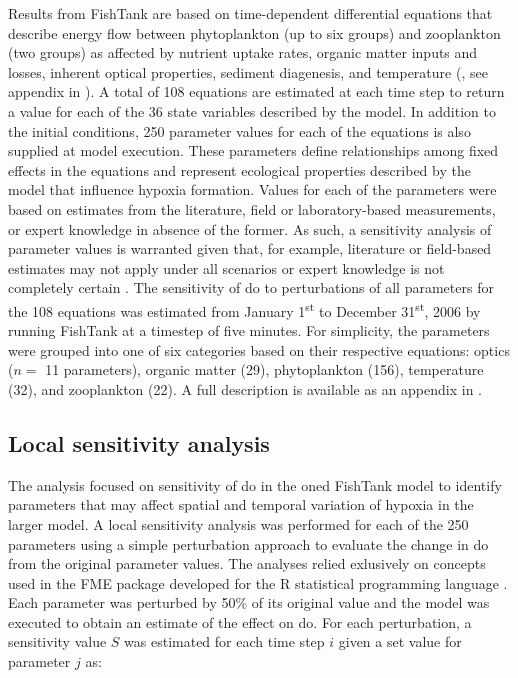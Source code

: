 \documentclass[letterpaper,12pt,oneside]{article}\usepackage[]{graphicx}\usepackage[]{color}
\begin{document}
Results from FishTank are based on time-dependent differential equations that describe energy flow between phytoplankton (up to six groups) and zooplankton (two groups) as affected by nutrient uptake rates, organic matter inputs and losses, inherent optical properties, sediment diagenesis, and temperature (\citealt{Penta08,Eldridge10}, see appendix in ).  A total of 108 equations are estimated at each time step to return a value for each of the 36 state variables described by the model.  In addition to the initial conditions, 250 parameter values for each of the equations is also supplied at model execution.  These parameters define relationships among fixed effects in the equations and represent ecological properties described by the model that influence hypoxia formation.  Values for each of the parameters were based on estimates from the literature, field or laboratory-based measurements, or expert knowledge in absence of the former.  As such, a sensitivity analysis of parameter values is warranted given that, for example, literature or field-based estimates may not apply under all scenarios or expert knowledge is not completely certain \citep{Refsgaard07}.  The sensitivity of \ac{do} to perturbations of all parameters for the 108 equations was estimated from January 1\textsuperscript{st} to December 31\textsuperscript{st}, 2006 by running FishTank at a timestep of five minutes.  For simplicity, the parameters were grouped into one of six categories based on their respective equations: optics ($n = $ 11 parameters), organic matter (29), phytoplankton (156), temperature (32), and zooplankton (22).  A full description is available as an appendix in .  

\subsection{Local sensitivity analysis}

The analysis focused on sensitivity of \ac{do} in the \ac{oned} FishTank model to identify parameters that may affect spatial and temporal variation of hypoxia in the larger model.  A local sensitivity analysis was performed for each of the 250 parameters using a simple perturbation approach to evaluate the change in \ac{do} from the original parameter values.  The analyses relied exlusively on concepts used in the FME package developed for the R statistical programming language \citep{Soetaert10}. Each parameter was perturbed by 50\% of its original value and the model was executed to obtain an estimate of the effect on \ac{do}.  For each perturbation, a sensitivity value $S$ was estimated for each time step $i$ given a set value for parameter $j$ as:
\end{document}

